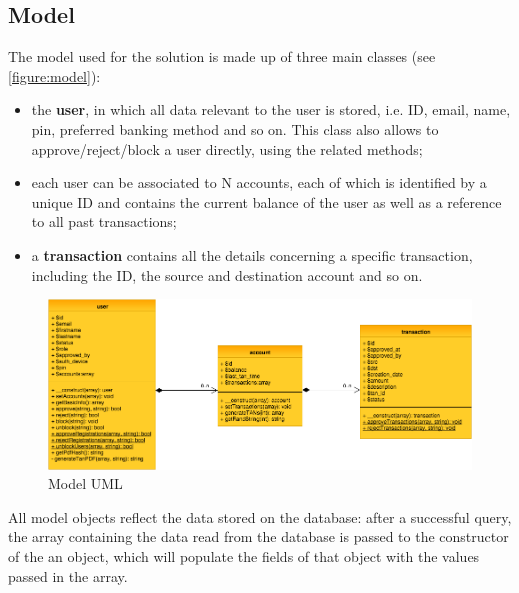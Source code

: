 \subsection{Model}
The model used for the \gnb{} solution is made up of three main classes (see \autoref{figure:model}):
\begin{itemize}
	\item the \textbf{user}, in which all data relevant to the user is stored, i.e. ID, email, name, pin, preferred banking method and so on. This class also allows to approve/reject/block a user directly, using the related methods;
	\item each user can be associated to N accounts, each of which is identified by a unique ID and contains the current balance of the user as well as a reference to all past transactions;
	\item a \textbf{transaction} contains all the details concerning a specific transaction, including the ID, the source and destination account and so on.
\end{itemize}
\begin{figure}[h!tbp]
	\centering
	\includegraphics[width=\textwidth]{figures/model_uml}
	\caption{Model UML}
	\label{figure:model}
\end{figure}
All model objects reflect the data stored on the database: after a successful query, the array containing the data read from the database is passed to the constructor of the an object, which will populate the fields of that object with the values passed in the array.

